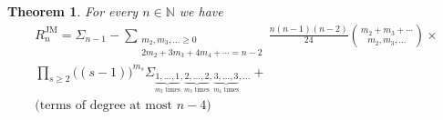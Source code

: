 \documentclass[12pt,dvips]{amsart}
\numberwithin{equation}{section} \numberwithin{figure}{section}
\theoremstyle{plain}
\newtheorem{theorem}[lemma]{Theorem}
\theoremstyle{definition}
\theoremstyle{remark}
\newcommand{\N}{{\mathbb{N}}}
\newcommand{\RJM}{R^{\JM}}
\DeclareMathOperator{\JM}{JM}
\begin{document}
\begin{theorem}
\label{theo:gagggag} For every $n\in\N$ we have
\begin{multline}
\label{eq:dukakao}
 \RJM_{n}=
 \Sigma_{n-1}- \!\!\!\! \sum_{\substack{m_2,m_3,\dots\geq 0 \\
2m_2+3 m_3+4 m_4+\cdots=n-2}} \!\!\!\!
\frac{n (n-1) (n-2)}{24} \binom{m_2+m_3+\cdots}{m_2,m_3,\dots} \times \\
\prod_{s\geq 2} \big( (s-1) \big)^{m_s}
\Sigma_{\underbrace{1,\dots,1}_{m_2 \text{ times}},
\underbrace{2,\dots,2}_{m_3 \text{ times}},
\underbrace{3,\dots,3}_{m_4 \text{ times}},\dots} +\\
\text{(terms of degree at most $n-4$)}
  \end{multline}

\end{theorem}
\end{document}
